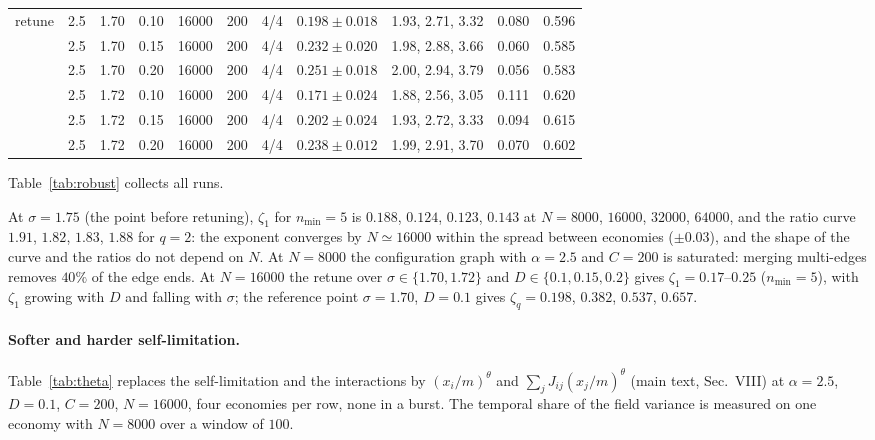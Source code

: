 \documentclass[pre,onecolumn,superscriptaddress,nofootinbib]{revtex4-2}
\begin{document}
\begin{table}[h]
\begin{ruledtabular}
\begin{tabular}{lcccccccccc}
\hline
retune & 2.5 & 1.70 & 0.10 & 16000 & 200 & 4/4 & $0.198\pm0.018$ & 1.93, 2.71, 3.32 & 0.080 & 0.596\\
 & 2.5 & 1.70 & 0.15 & 16000 & 200 & 4/4 & $0.232\pm0.020$ & 1.98, 2.88, 3.66 & 0.060 & 0.585\\
 & 2.5 & 1.70 & 0.20 & 16000 & 200 & 4/4 & $0.251\pm0.018$ & 2.00, 2.94, 3.79 & 0.056 & 0.583\\
 & 2.5 & 1.72 & 0.10 & 16000 & 200 & 4/4 & $0.171\pm0.024$ & 1.88, 2.56, 3.05 & 0.111 & 0.620\\
 & 2.5 & 1.72 & 0.15 & 16000 & 200 & 4/4 & $0.202\pm0.024$ & 1.93, 2.72, 3.33 & 0.094 & 0.615\\
 & 2.5 & 1.72 & 0.20 & 16000 & 200 & 4/4 & $0.238\pm0.012$ & 1.99, 2.91, 3.70 & 0.070 & 0.602\\
\end{tabular}
\end{ruledtabular}
\end{table}

Table~\ref{tab:robust} collects all runs.

At $\sigma=1.75$ (the point before retuning), $\zeta_1$ for $n_{\min}=5$ is $0.188$, $0.124$, $0.123$, $0.143$ at
$N=8000$, $16000$, $32000$, $64000$, and the ratio curve $1.91$, $1.82$, $1.83$, $1.88$ for $q=2$: the
exponent converges by $N\simeq16000$ within the spread between economies ($\pm0.03$), and the shape of
the curve and the ratios do not depend on $N$.  At $N=8000$ the configuration graph with $\alpha=2.5$ and
$C=200$ is saturated: merging multi-edges removes $40\%$ of the edge ends.  At $N=16000$ the retune over
$\sigma\in\{1.70,1.72\}$ and $D\in\{0.1,0.15,0.2\}$ gives $\zeta_1=0.17$--$0.25$ ($n_{\min}=5$), with $\zeta_1$ growing
with $D$ and falling with $\sigma$; the reference point $\sigma=1.70$, $D=0.1$ gives $\zeta_q=0.198$, $0.382$, $0.537$,
$0.657$.

\paragraph{Softer and harder self-limitation.}  Table~\ref{tab:theta} replaces the self-limitation and
the interactions by $(x_i/m)^\theta$ and $\sum_jJ_{ij}(x_j/m)^\theta$ (main text, Sec.~VIII) at $\alpha=2.5$, $D=0.1$, $C=200$,
$N=16000$, four economies per row, none in a burst.  The temporal share of the field variance is measured on
one economy with $N=8000$ over a window of $100$.
\end{document}
